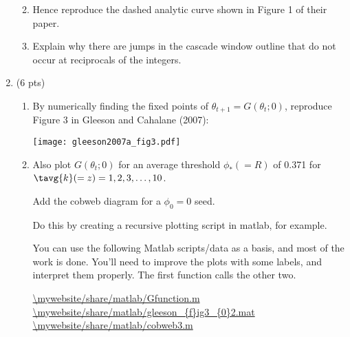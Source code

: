 \begin{enumerate}
\begin{enumerate}
   \solutionend

  \item 
    Hence reproduce the dashed analytic curve 
    shown in Figure 1 of their paper.

    
   \solutionstart


   \solutionend

  \item 
    Explain why there are jumps in the 
    cascade window outline that do not occur at
    reciprocals of the integers.

    
   \solutionstart


   \solutionend

  \end{enumerate}

\item (6 pts)

  \begin{enumerate}
  \item 
    By numerically finding the fixed points of
    $\theta_{t+1} = G(\theta_{t};0)$,
    reproduce Figure 3 in Gleeson and Cahalane (2007):

    \texttt{[image: gleeson2007a\_fig3.pdf]}

    
   \solutionstart


   \solutionend

  \item
    Also plot $G(\theta_{t};0)$ for an average
    threshold $\phi_{\ast} (= R)$ of 0.371 for $\tavg{k} (= z) = 1, 2, 3, \ldots, 10$.

    Add the cobweb diagram for a $\phi_{0}=0$ seed.  

    Do this by creating a recursive plotting script in matlab, for example.

    You can use the following Matlab scripts/data as a basis, and most of the work is done.
    You'll need to improve the plots with some labels, and interpret
    them properly.  The first function calls the other two.

    \url{\mywebsite/share/matlab/Gfunction.m}\\
    \url{\mywebsite/share/matlab/gleeson_{f}ig3_{0}2.mat}\\
    \url{\mywebsite/share/matlab/cobweb3.m}

    
   \solutionstart


\end{enumerate}
\end{enumerate}

